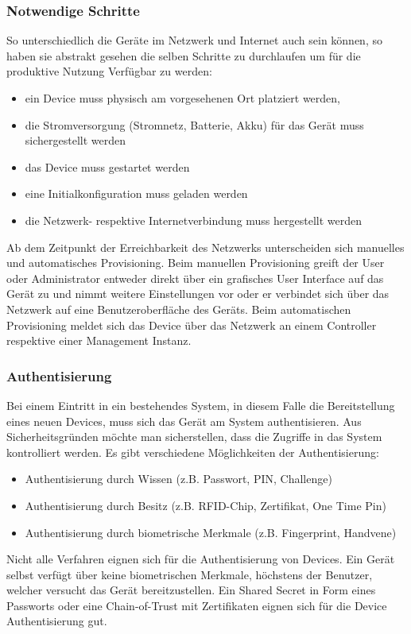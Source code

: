 \subsubsection{Notwendige Schritte}So unterschiedlich die Geräte im Netzwerk und Internet auch sein können, so haben sie abstrakt gesehen die selben Schritte zu durchlaufen um für die produktive Nutzung Verfügbar zu werden:
\begin{itemize}
\item ein Device muss physisch am vorgesehenen Ort platziert werden,
\item die Stromversorgung (Stromnetz, Batterie, Akku) für das Gerät muss sichergestellt werden
\item das Device muss gestartet werden
\item eine Initialkonfiguration muss geladen werden
\item die Netzwerk- respektive Internetverbindung muss hergestellt werden
\end{itemize}
Ab dem Zeitpunkt der Erreichbarkeit des Netzwerks unterscheiden sich manuelles und automatisches Provisioning. Beim manuellen Provisioning greift der User oder Administrator entweder direkt über ein grafisches User Interface auf das Gerät zu und nimmt weitere Einstellungen vor oder er verbindet sich über das Netzwerk auf eine Benutzeroberfläche des Geräts. Beim automatischen Provisioning meldet sich das Device über das Netzwerk an einem Controller respektive einer Management Instanz.

\subsubsection{Authentisierung} Bei einem Eintritt in ein bestehendes System, in diesem Falle die Bereitstellung eines neuen Devices, muss sich das Gerät am System authentisieren. Aus Sicherheitsgründen möchte man sicherstellen, dass die Zugriffe in das System kontrolliert werden. Es gibt verschiedene Möglichkeiten der Authentisierung:
\begin{itemize}
\item Authentisierung durch Wissen (z.B. Passwort, PIN, Challenge)
\item Authentisierung durch Besitz (z.B. RFID-Chip, Zertifikat, One Time Pin)
\item Authentisierung durch biometrische Merkmale (z.B. Fingerprint, Handvene)
\end{itemize}
Nicht alle Verfahren eignen sich für die Authentisierung von Devices. Ein Gerät selbst verfügt über keine biometrischen Merkmale, höchstens der Benutzer, welcher versucht das Gerät bereitzustellen. Ein Shared Secret in Form eines Passworts oder eine Chain-of-Trust mit Zertifikaten eignen sich für die Device Authentisierung gut. 

